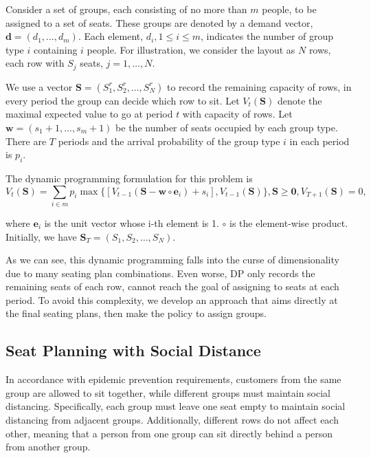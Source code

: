 Consider a set of groups, each consisting of no more than $m$ people, to be assigned to a set of seats. These groups are denoted by a demand vector, $\mathbf{d} = (d_1, \ldots, d_m)$. Each element, $d_i, 1 \leq i \leq m$, indicates the number of group type $i$ containing $i$ people. For illustration, we consider the layout as $N$ rows, each row with $S_{j}$ seats, $j = 1, \ldots, N$. 


We use a vector $\mathbf{S}= (S^{r}_1, S^{r}_2, \ldots, S^{r}_{N})$ to record the remaining capacity of rows, in every period the group can decide which row to sit. Let $V_{t}(\mathbf{S})$ denote the maximal expected value to go at period $t$ with capacity of rows. Let $\mathbf{w} = (s_1+1, \ldots, s_m+1)$ be the number of seats occupied by each group type. There are $T$ periods and the arrival probability of the group type $i$ in each period is $p_i$. 

The dynamic programming formulation for this problem is
$$V_{t}(\mathbf{S}) = \sum_{i \in m} p_i \max\{ {[V_{t-1}(\mathbf{S}- \mathbf{w} \circ \mathbf{e}_{i})+ s_i]}, {V_{t-1}(\mathbf{S})}\}, \mathbf{S} \geq \mathbf{0}, V_{T+1}(\mathbf{S}) = 0,$$

where $\mathbf{e}_{i}$ is the unit vector whose i-th element is 1. $\circ$ is the element-wise product. Initially, we have $\mathbf{S}_{T} = (S_1, S_2, \ldots, S_{N})$. 

As we can see, this dynamic programming falls into the curse of dimensionality due to many seating plan combinations. Even worse, DP only records the remaining seats of each row, cannot reach the goal of assigning to seats at each period. To avoid this complexity, we develop an approach that aims directly at the final seating plans, then make the policy to assign groups. 




\subsection{Seat Planning with Social Distance}


In accordance with epidemic prevention requirements, customers from the same group are allowed to sit together, while different groups must maintain social distancing. Specifically, each group must leave one seat empty to maintain social distancing from adjacent groups. Additionally, different rows do not affect each other, meaning that a person from one group can sit directly behind a person from another group.

